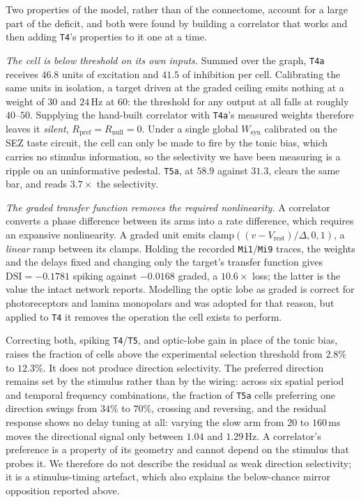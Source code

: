\documentclass[10pt,twoside]{article}
\newcommand{\cell}[1]{\texttt{#1}}
\begin{document}
Two properties of the model, rather than of the connectome, account for a
large part of the deficit, and both were found by building a correlator that
works and then adding \cell{T4}'s properties to it one at a time.

\emph{The cell is below threshold on its own inputs.} Summed over the graph,
\cell{T4a} receives $46.8$ units of excitation and $41.5$ of inhibition per
cell. Calibrating the same units in isolation, a target driven at the graded
ceiling emits nothing at a weight of $30$ and $24$\,Hz at $60$: the threshold
for any output at all falls at roughly $40$--$50$. Supplying the hand-built
correlator with \cell{T4a}'s measured weights therefore leaves it \emph{silent},
$R_{\mathrm{pref}}=R_{\mathrm{null}}=0$. Under a single global $W_{\mathrm{syn}}$
calibrated on the SEZ taste circuit, the cell can only be made to fire by the
tonic bias, which carries no stimulus information, so the selectivity we have
been measuring is a ripple on an uninformative pedestal. \cell{T5a}, at $58.9$
against $31.3$, clears the same bar, and reads $3.7\times$ the selectivity.

\emph{The graded transfer function removes the required nonlinearity.} A
correlator converts a phase difference between its arms into a rate difference,
which requires an expansive nonlinearity. A graded unit emits
$\mathrm{clamp}((v-V_{\mathrm{rest}})/\Delta,0,1)$, a \emph{linear} ramp between
its clamps. Holding the recorded \cell{Mi1}/\cell{Mi9} traces, the weights and
the delays fixed and changing only the target's transfer function gives
$\mathrm{DSI}=-0.1781$ spiking against $-0.0168$ graded, a $10.6\times$ loss;
the latter is the value the intact network reports. Modelling the optic lobe as
graded is correct for photoreceptors and lamina monopolars and was adopted for
that reason, but applied to \cell{T4} it removes the operation the cell exists
to perform.

Correcting both, spiking \cell{T4}/\cell{T5}, and optic-lobe gain in place of
the tonic bias, raises the fraction of cells above the experimental selection
threshold from $2.8\%$ to $12.3\%$. It does not produce direction selectivity.
The preferred direction remains set by the stimulus rather than by the wiring:
across six spatial period and temporal frequency combinations, the fraction of
\cell{T5a} cells preferring one direction swings from $34\%$ to $70\%$, crossing
and reversing, and the residual response shows no delay tuning at all: varying
the slow arm from $20$ to $160$\,ms moves the directional signal only between
$1.04$ and $1.29$\,Hz. A correlator's preference is a property of its geometry
and cannot depend on the stimulus that probes it. We therefore do not describe
the residual as weak direction selectivity; it is a stimulus-timing artefact,
which also explains the below-chance mirror opposition reported above.
\end{document}
